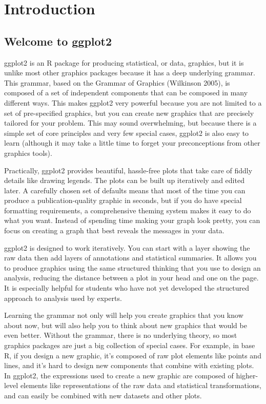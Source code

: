 \chapter{Introduction}\label{cha:introduction}

\section{Welcome to ggplot2}

ggplot2 is an R package for producing statistical, or data, graphics,
but it is unlike most other graphics packages because it has a deep
underlying grammar. This grammar, based on the Grammar of Graphics
(Wilkinson 2005), is composed of a set of independent components that
can be composed in many different ways. This makes ggplot2 very powerful
because you are not limited to a set of pre-specified graphics, but you
can create new graphics that are precisely tailored for your problem.
This may sound overwhelming, but because there is a simple set of core
principles and very few special cases, ggplot2 is also easy to learn
(although it may take a little time to forget your preconceptions from
other graphics tools).

Practically, ggplot2 provides beautiful, hassle-free plots that take
care of fiddly details like drawing legends. The plots can be built up
iteratively and edited later. A carefully chosen set of defaults means
that most of the time you can produce a publication-quality graphic in
seconds, but if you do have special formatting requirements, a
comprehensive theming system makes it easy to do what you want. Instead
of spending time making your graph look pretty, you can focus on
creating a graph that best reveals the messages in your data.

ggplot2 is designed to work iteratively. You can start with a layer
showing the raw data then add layers of annotations and statistical
summaries. It allows you to produce graphics using the same structured
thinking that you use to design an analysis, reducing the distance
between a plot in your head and one on the page. It is especially
helpful for students who have not yet developed the structured approach
to analysis used by experts.

Learning the grammar not only will help you create graphics that you
know about now, but will also help you to think about new graphics that
would be even better. Without the grammar, there is no underlying
theory, so most graphics packages are just a big collection of special
cases. For example, in base R, if you design a new graphic, it's
composed of raw plot elements like points and lines, and it's hard to
design new components that combine with existing plots. In ggplot2, the
expressions used to create a new graphic are composed of higher-level
elements like representations of the raw data and statistical
transformations, and can easily be combined with new datasets and other
plots.

